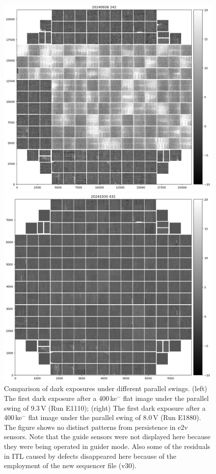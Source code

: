 \begin{figure}
\centering
\begin{minipage}[b]{0.45\textwidth}
\centering
\includegraphics[width=\textwidth]{figures/E1110dp93.png}
\end{minipage}
\hfill
\begin{minipage}[b]{0.45\textwidth}
\centering
\includegraphics[width=\textwidth]{figures/E1880dp80.png}
\end{minipage}
\caption{Comparison of dark exposures under different parallel swings. (left) The first dark exposure after a 400\,ke$^-$ flat image under the parallel swing of 9.3\,V (Run E1110); (right) The first dark exposure after a 400\,ke$^-$ flat image under the parallel swing of 8.0\,V (Run E1880). The figure shows no distinct patterns from persistence in e2v sensors. Note that the guide sensors were not displayed here because they were being operated in guider mode. Also some of the residuals in ITL caused by defects disappeared here because of the employment of the new sequencer file (v30).}
\label{fig:persistence-reduction}
\end{figure}
